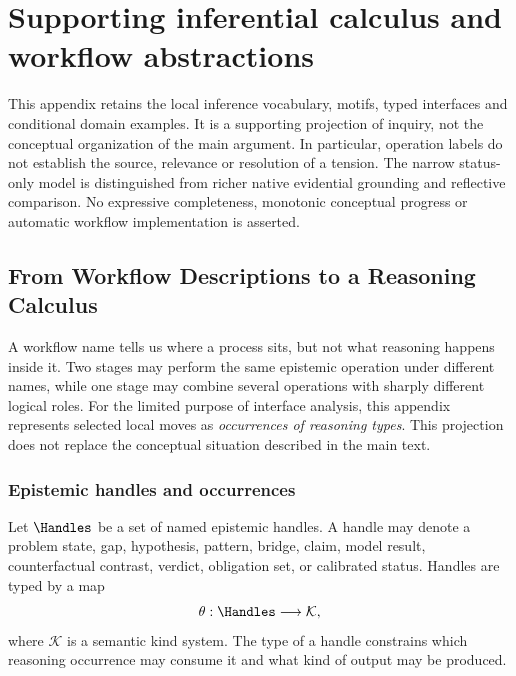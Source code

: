 %
%
%
\clearpage
\section{Supporting inferential calculus and workflow abstractions}
\label{app:supporting-calculus}
This appendix retains the local inference vocabulary, motifs, typed interfaces
and conditional domain examples. It is a supporting projection of inquiry, not
the conceptual organization of the main argument. In particular, operation
labels do not establish the source, relevance or resolution of a tension.
The narrow status-only model is distinguished from richer native evidential
grounding and reflective comparison. No expressive completeness, monotonic
conceptual progress or automatic workflow implementation is asserted.

\subsection{From Workflow Descriptions to a Reasoning Calculus}

A workflow name tells us where a process sits, but not what reasoning happens
inside it. Two stages may perform the same epistemic operation under different
names, while one stage may combine several operations with sharply different
logical roles. For the limited purpose of interface analysis, this appendix represents
selected local moves as \emph{occurrences of reasoning types}. This projection
does not replace the conceptual situation described in the main text.

\subsubsection{Epistemic handles and occurrences}

Let $\Handles$ be a set of named epistemic handles. A handle may denote a
problem state, gap, hypothesis, pattern, bridge, claim, model result,
counterfactual contrast, verdict, obligation set, or calibrated status.
Handles are typed by a map
\[
  \theta:\Handles\longrightarrow\mathcal{K},
\]
where $\mathcal{K}$ is a semantic kind system. The type of a handle constrains
which reasoning occurrence may consume it and what kind of output may be
produced.

